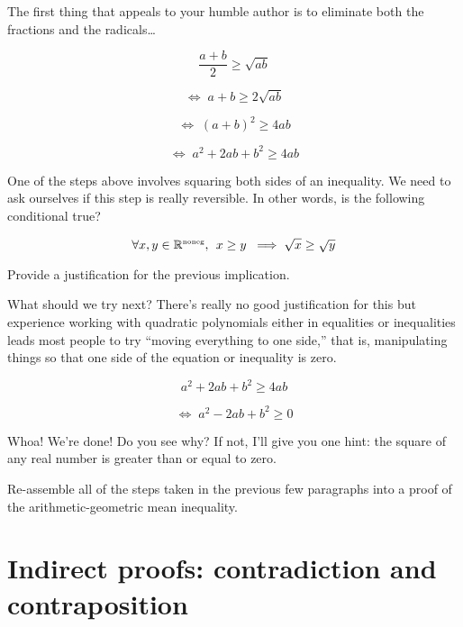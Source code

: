 The first thing that appeals to your humble author is to eliminate
both the fractions and the radicals\ldots

\[ \frac{a+b}{2} \geq \sqrt{ab} \]

\[ \iff \; a+b \geq 2\sqrt{ab} \]

\[ \iff \; (a+b)^2 \geq 4ab \] 

\[ \iff \; a^2+2ab+b^2 \geq 4ab \] 

One of the steps above involves squaring both sides of an inequality.
We need to ask ourselves if this step is really reversible.  In other
words, is the following conditional true?

\[ \forall x,y \in {\mathbb R}^{\mbox{\tiny noneg}}, \, \; 
x \geq y \; \implies \sqrt{x} \geq \sqrt{y} \]

\begin{exer} 
Provide a justification for the previous implication.
\end{exer}

What should we try next?  There's really no good justification for
this but experience working with quadratic polynomials either in 
equalities or inequalities leads most people to try ``moving everything
to one side,'' that is, manipulating things so that one side of the 
equation or inequality is zero.

\[  a^2+2ab+b^2 \geq 4ab \] 

\[ \iff \; a^2-2ab+b^2 \geq 0 \] 

Whoa!  We're done!  Do you see why?  If not, I'll give you one
hint:  the square of any real number is greater than or equal to
zero.

\begin{exer} 
Re-assemble all of the steps taken in the previous few paragraphs
into a proof of the arithmetic-geometric mean inequality.
\end{exer}

 
\clearpage




\newpage

\section[Contradiction and contraposition]{Indirect proofs: contradiction and contraposition}
\label{sec:contra}

